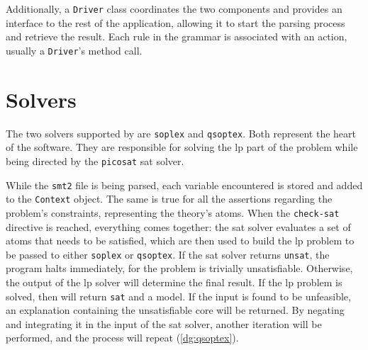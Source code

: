 Additionally, a \texttt{Driver} class coordinates the two components and provides an interface to the rest of the application, allowing it to start the parsing process and retrieve the result.
Each rule in the grammar is associated with an action, usually a \texttt{Driver}'s method call.





\section{Solvers}

The two solvers supported by \dlinear are \texttt{soplex} and \texttt{qsoptex}.
Both represent the heart of the software.
They are responsible for solving the \gls{lp} part of the problem while being directed by the \texttt{picosat} \gls{sat} solver.

While the \texttt{smt2} file is being parsed, each variable encountered is stored and added to the \texttt{Context} object.
The same is true for all the assertions regarding the problem's constraints, representing the theory's atoms.
When the \texttt{check-sat} directive is reached, everything comes together: the \gls{sat} solver evaluates a set of atoms that needs to be satisfied, which are then used to build the \gls{lp} problem to be passed to either \texttt{soplex} or \texttt{qsoptex}.
If the \gls{sat} solver returns \texttt{unsat}, the program halts immediately, for the problem is trivially unsatisfiable.
Otherwise, the output of the \gls{lp} solver will determine the final result.
If the \gls{lp} problem is solved, then \dlinear will return \texttt{sat} and a model.
If the input is found to be unfeasible, an explanation containing the unsatisfiable core will be returned.
By negating and integrating it in the input of the \gls{sat} solver, another iteration will be performed, and the process will repeat (\autoref{dg:qsoptex}).


